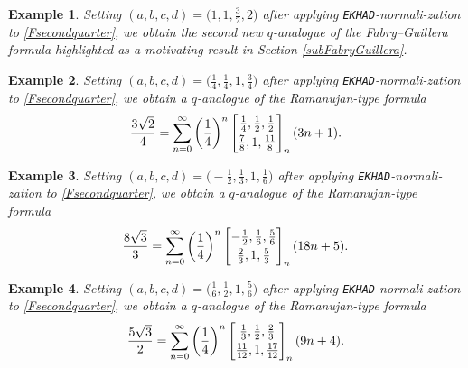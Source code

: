 \documentclass[12pt]{article}
\newtheorem{example}{Example}
\begin{document}
\begin{example}
 Setting $(a, b, c, d) = \big( 1, 1, \frac{3}{2}, 2 \big)$ after applying {\tt EKHAD}-normali-zation to \eqref{Fsecondquarter}, 
 we obtain the second new $q$-analogue of the Fabry--Guillera formula highlighted 
 as a motivating result in Section \ref{subFabryGuillera}. 
\end{example} 

\begin{example}
 Setting $(a, b, c, d) = \big( \frac{1}{4}, \frac{1}{4}, 1, \frac{3}{4} \big)$ 
 after applying {\tt EKHAD}-normali-zation to \eqref{Fsecondquarter}, 
 we obtain a $q$-analogue of the Ramanujan-type formula 
 $$ \frac{3\sqrt{2}}{4} = \sum_{n = 0}^{\infty} 
 \left( \frac{1}{4} \right)^{n} \left[ \begin{matrix} 
 \frac{1}{4}, \frac{1}{2}, \frac{1}{2} \vspace{1mm} \\ 
 \frac{7}{8}, 1, \frac{11}{8} \end{matrix} \right]_{n} (3n+1). $$
\end{example} 

\begin{example}
 Setting $(a, b, c, d) = \big( -\frac{1}{2}, \frac{1}{3}, 1, \frac{1}{6} \big)$ after applying {\tt EKHAD}-normali-zation to \eqref{Fsecondquarter}, 
 we obtain a $q$-analogue of the Ramanujan-type formula 
 $$ \frac{8 \sqrt{3}}{3} = \sum_{n = 0}^{\infty} 
 \left( \frac{1}{4} \right)^{n} \left[ \begin{matrix} 
 -\frac{1}{2}, \frac{1}{6}, \frac{5}{6} \vspace{1mm} \\ 
 \frac{2}{3}, 1, \frac{5}{3} \end{matrix} \right]_{n} (18 n + 5). $$
\end{example} 

\begin{example}
 Setting $(a, b, c, d) = \big( \frac{1}{6}, \frac{1}{2}, 1, \frac{5}{6} \big)$ after applying {\tt EKHAD}-normali-zation to \eqref{Fsecondquarter}, 
 we obtain a $q$-analogue of the Ramanujan-type formula 
 $$ \frac{5 \sqrt{3}}{2} = \sum_{n = 0}^{\infty} 
 \left( \frac{1}{4} \right)^{n} \left[ \begin{matrix} 
 \frac{1}{3}, \frac{1}{2}, \frac{2}{3} \vspace{1mm} \\ 
 \frac{11}{12}, 1, \frac{17}{12} \end{matrix} \right]_{n} (9 n + 4). $$
\end{example} 
\end{document}
